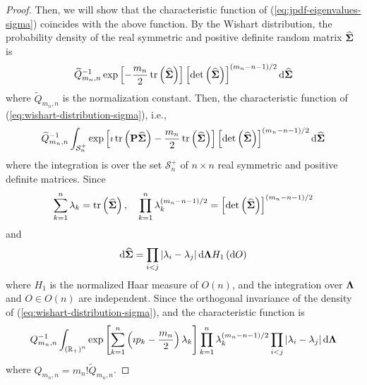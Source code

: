\begin{proof}
	Then, we will show that the characteristic function of (\ref{eq:jpdf-eigenvalues-sigma}) coincides with the above function. By the Wishart distribution, the probability density of the real symmetric and positive definite random matrix $\widehat{\boldsymbol{\Sigma}}$ is
	\begin{equation}
		\widetilde{Q}_{m_{n},n}^{-1}\exp\left[-\frac{m_{n}}{2}\operatorname{tr}\left(\widehat{\boldsymbol{\Sigma}}\right)\right]\left[\operatorname{det}\left(\widehat{\boldsymbol{\Sigma}}\right)\right]^{(m_{n}-n-1)/2}\mathop{}\!\mathrm{d}\widehat{\boldsymbol{\Sigma}}
		\label{eq:wishart-distribution-sigma}
	\end{equation}
	where $\widetilde{Q}_{m_{n},n}$ is the normalization constant. Then, the characteristic function of (\ref{eq:wishart-distribution-sigma}), i.e.,
	\begin{equation*}
		\widetilde{Q}_{m_{n},n}^{-1}\int_{\mathcal{S}_{n}^{+}}\exp\left[\imath\operatorname{tr}\left(\mathbf{P}\widehat{\boldsymbol{\Sigma}}\right)-\frac{m_{n}}{2}\operatorname{tr}\left(\widehat{\boldsymbol{\Sigma}}\right)\right]\left[\operatorname{det}\left(\widehat{\boldsymbol{\Sigma}}\right)\right]^{(m_{n}-n-1)/2}\mathop{}\!\mathrm{d}\widehat{\boldsymbol{\Sigma}}
	\end{equation*}
	where the integration is over the set $\mathcal{S}_{n}^{+}$ of $n\times n$ real symmetric and positive definite matrices. Since
	\begin{equation*}
		\sum_{k=1}^{n}\lambda_{k}=\operatorname{tr}\left(\widehat{\boldsymbol{\Sigma}}\right),\quad\prod_{k=1}^{n}\lambda_{k}^{(m_{n}-n-1)/2}=\left[\operatorname{det}\left(\widehat{\boldsymbol{\Sigma}}\right)\right]^{(m_{n}-n-1)/2}
	\end{equation*}
	and
	\begin{equation*}
		\mathop{}\!\mathrm{d}\widehat{\boldsymbol{\Sigma}}=\prod_{i<j}\left|\lambda_{i}-\lambda_{j}\right|\mathop{}\!\mathrm{d}\boldsymbol{\Lambda} H_{1}\left(\mathop{}\!\mathrm{d} O\right)
	\end{equation*}
	where $H_{1}$ is the normalized Haar measure of $O(n)$, and the integration over $\boldsymbol{\Lambda}$ and $O\in O(n)$ are independent. Since the orthogonal invariance of the density of (\ref{eq:wishart-distribution-sigma}), and the characteristic function is
	\begin{equation}
		Q_{m_{n},n}^{-1}\int_{\left({\mathbb R}_{+}\right)^{n}}\exp\left[\sum_{k=1}^{n}\left(\imath p_{k}-\frac{m_{n}}{2}\right)\lambda_{k}\right]\prod_{k=1}^{n}\lambda_{k}^{(m_{n}-n-1)/2}\prod_{i<j}\left|\lambda_{i}-\lambda_{j}\right|\mathop{}\!\mathrm{d}\boldsymbol{\Lambda}
		\label{eq:characteristic-function-wishart}
	\end{equation}
	where $Q_{m_{n},n}=m_{n}!\widetilde{Q}_{m_{n},n}$.


\end{proof}
